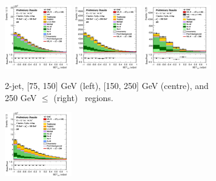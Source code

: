 \begin{figure}[h!]
    \centering
    \begin{subfigure}[b]{\textwidth}
        \centering
        \includegraphics[width=0.32\textwidth]{Images/VH/Own_fit/postfit_VHcc/Region_distmva_BMax150_BMin75_DSR_J2_TTypext_T2_L1_Y6051_GlobalFit_conditionnal_mu1.png}
        \includegraphics[width=0.32\textwidth]{Images/VH/Own_fit/postfit_VHcc/Region_distmva_BMax250_BMin150_DSR_J2_TTypext_T2_L1_Y6051_GlobalFit_conditionnal_mu1.png}
        \includegraphics[width=0.32\textwidth]{Images/VH/Own_fit/postfit_VHcc/Region_distmva_BMin250_DSR_J2_TTypext_T2_L1_Y6051_GlobalFit_conditionnal_mu1.png}
        \caption{2-jet, [75, 150] GeV (left), [150, 250] GeV (centre), and 250  GeV $\leq$ (right) \ptv\ regions.}
        \label{fig:plots_VHcc_1L_SR_2J_2c}
    \end{subfigure}
    \begin{subfigure}[b]{\textwidth}
        \centering
        \includegraphics[width=0.32\textwidth]{Images/VH/Own_fit/postfit_VHcc/Region_distmva_BMax150_BMin75_DSR_J3_TTypext_T2_L1_Y6051_GlobalFit_conditionnal_mu1.png}

\end{subfigure}
\end{figure}
